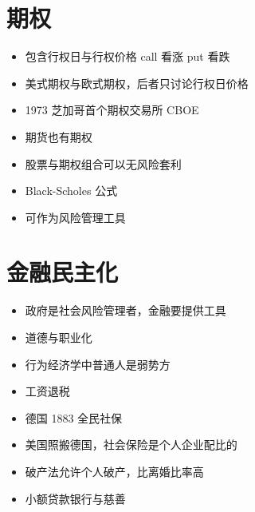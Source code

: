 \documentclass[
]{book}
\providecommand{\tightlist}{%
  \setlength{\itemsep}{0pt}\setlength{\parskip}{0pt}}
\begin{document}
\hypertarget{ux671fux6743}{%
\section{期权}\label{ux671fux6743}}

\begin{itemize}
\tightlist
\item
  包含行权日与行权价格 call 看涨 put 看跌
\item
  美式期权与欧式期权，后者只讨论行权日价格
\item
  1973 芝加哥首个期权交易所 CBOE
\item
  期货也有期权
\item
  股票与期权组合可以无风险套利
\item
  Black-Scholes 公式
\item
  可作为风险管理工具
\end{itemize}

\hypertarget{ux91d1ux878dux6c11ux4e3bux5316}{%
\section{金融民主化}\label{ux91d1ux878dux6c11ux4e3bux5316}}

\begin{itemize}
\tightlist
\item
  政府是社会风险管理者，金融要提供工具
\item
  道德与职业化
\item
  行为经济学中普通人是弱势方
\item
  工资退税
\item
  德国 1883 全民社保
\item
  美国照搬德国，社会保险是个人企业配比的
\item
  破产法允许个人破产，比离婚比率高
\item
  小额贷款银行与慈善
\end{itemize}
\end{document}
